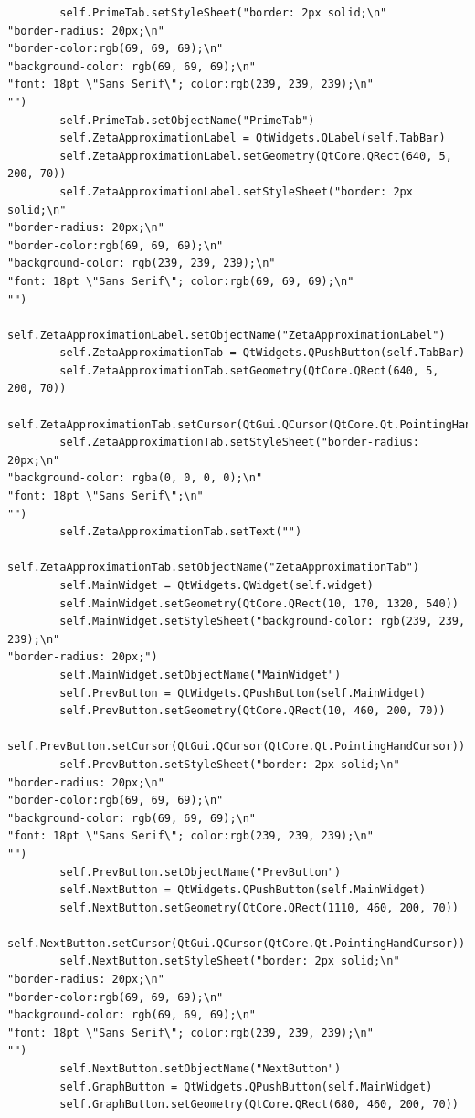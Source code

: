 \documentclass[12pt]{article}
\begin{document}
\begin{lstlisting}
        self.PrimeTab.setStyleSheet("border: 2px solid;\n"
"border-radius: 20px;\n"
"border-color:rgb(69, 69, 69);\n"
"background-color: rgb(69, 69, 69);\n"
"font: 18pt \"Sans Serif\"; color:rgb(239, 239, 239);\n"
"")
        self.PrimeTab.setObjectName("PrimeTab")
        self.ZetaApproximationLabel = QtWidgets.QLabel(self.TabBar)
        self.ZetaApproximationLabel.setGeometry(QtCore.QRect(640, 5, 200, 70))
        self.ZetaApproximationLabel.setStyleSheet("border: 2px solid;\n"
"border-radius: 20px;\n"
"border-color:rgb(69, 69, 69);\n"
"background-color: rgb(239, 239, 239);\n"
"font: 18pt \"Sans Serif\"; color:rgb(69, 69, 69);\n"
"")
        self.ZetaApproximationLabel.setObjectName("ZetaApproximationLabel")
        self.ZetaApproximationTab = QtWidgets.QPushButton(self.TabBar)
        self.ZetaApproximationTab.setGeometry(QtCore.QRect(640, 5, 200, 70))
        self.ZetaApproximationTab.setCursor(QtGui.QCursor(QtCore.Qt.PointingHandCursor))
        self.ZetaApproximationTab.setStyleSheet("border-radius: 20px;\n"
"background-color: rgba(0, 0, 0, 0);\n"
"font: 18pt \"Sans Serif\";\n"
"")
        self.ZetaApproximationTab.setText("")
        self.ZetaApproximationTab.setObjectName("ZetaApproximationTab")
        self.MainWidget = QtWidgets.QWidget(self.widget)
        self.MainWidget.setGeometry(QtCore.QRect(10, 170, 1320, 540))
        self.MainWidget.setStyleSheet("background-color: rgb(239, 239, 239);\n"
"border-radius: 20px;")
        self.MainWidget.setObjectName("MainWidget")
        self.PrevButton = QtWidgets.QPushButton(self.MainWidget)
        self.PrevButton.setGeometry(QtCore.QRect(10, 460, 200, 70))
        self.PrevButton.setCursor(QtGui.QCursor(QtCore.Qt.PointingHandCursor))
        self.PrevButton.setStyleSheet("border: 2px solid;\n"
"border-radius: 20px;\n"
"border-color:rgb(69, 69, 69);\n"
"background-color: rgb(69, 69, 69);\n"
"font: 18pt \"Sans Serif\"; color:rgb(239, 239, 239);\n"
"")
        self.PrevButton.setObjectName("PrevButton")
        self.NextButton = QtWidgets.QPushButton(self.MainWidget)
        self.NextButton.setGeometry(QtCore.QRect(1110, 460, 200, 70))
        self.NextButton.setCursor(QtGui.QCursor(QtCore.Qt.PointingHandCursor))
        self.NextButton.setStyleSheet("border: 2px solid;\n"
"border-radius: 20px;\n"
"border-color:rgb(69, 69, 69);\n"
"background-color: rgb(69, 69, 69);\n"
"font: 18pt \"Sans Serif\"; color:rgb(239, 239, 239);\n"
"")
        self.NextButton.setObjectName("NextButton")
        self.GraphButton = QtWidgets.QPushButton(self.MainWidget)
        self.GraphButton.setGeometry(QtCore.QRect(680, 460, 200, 70))

\end{lstlisting}
\end{document}
